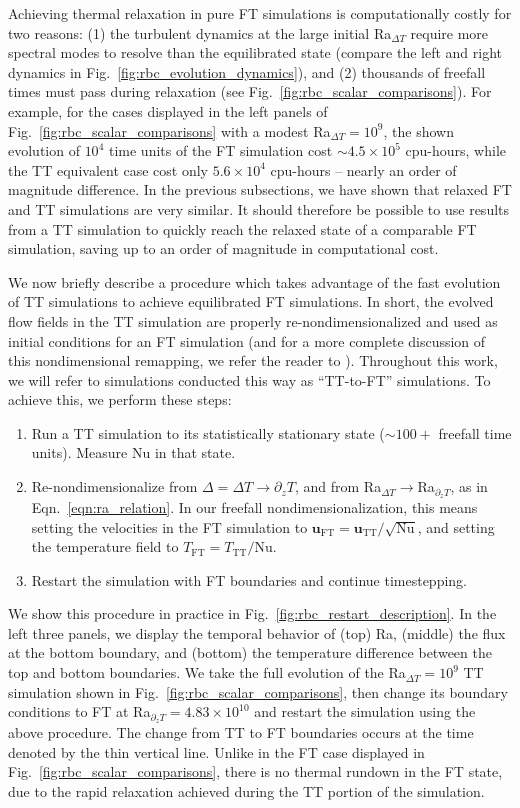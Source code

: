 Achieving thermal relaxation in pure FT simulations is computationally costly for two reasons: (1) the turbulent dynamics at the large initial Ra$_{\Delta T}$ require more spectral modes to resolve than the equilibrated state (compare the left and right dynamics in Fig.~\ref{fig:rbc_evolution_dynamics}), and (2) thousands of freefall times must pass during relaxation (see Fig.~\ref{fig:rbc_scalar_comparisons}).
For example, for the cases displayed in the left panels of Fig.~\ref{fig:rbc_scalar_comparisons} with a modest Ra$_{\Delta T} = 10^9$, the shown evolution of $10^4$ time units of the FT simulation cost $\sim 4.5 \times 10^5$ cpu-hours, while the TT equivalent case cost only $5.6 \times 10^4$ cpu-hours -- nearly an order of magnitude difference.
In the previous subsections, we have shown that relaxed FT and TT simulations are very similar.
It should therefore be possible to use results from a TT simulation to quickly reach the relaxed state of a comparable FT simulation, saving up to an order of magnitude in computational cost.

We now briefly describe a procedure which takes advantage of the fast evolution of TT simulations to achieve equilibrated FT simulations.
In short, the evolved flow fields in the TT simulation are properly re-nondimensionalized and used as initial conditions for an FT simulation (and for a more complete discussion of this nondimensional remapping, we refer the reader to \citet{calkins&all2015b}).
Throughout this work, we will refer to simulations conducted this way as ``TT-to-FT'' simulations.
To achieve this, we perform these steps:
\begin{enumerate}
\item Run a TT simulation to its statistically stationary state ($\sim100+$ freefall time units). 
Measure $\text{Nu}$ in that state.
\item Re-nondimensionalize from $\Delta = \Delta T \rightarrow \partial_z T$, and from Ra$_{\Delta T}\rightarrow$Ra$_{\partial_z T}$, as in Eqn.~\ref{eqn:ra_relation}.
In our freefall nondimensionalization, this means setting the velocities in the FT simulation to $\bm{u}_{\text{FT}} = \bm{u}_{\text{TT}} / \sqrt{\text{Nu}}$, and setting the temperature field to $T_{\text{FT}} = T_{\text{TT}} / \text{Nu}$.
\item Restart the simulation with FT boundaries and continue timestepping.
\end{enumerate}
We show this procedure in practice in Fig.~\ref{fig:rbc_restart_description}.
In the left three panels, we display the temporal behavior of (top) Ra, (middle) the flux at the bottom boundary, and (bottom) the temperature difference between the top and bottom boundaries.
We take the full evolution of the Ra$_{\Delta T} = 10^9$ TT simulation shown in Fig.~\ref{fig:rbc_scalar_comparisons}, then change its boundary conditions to FT at Ra$_{\partial_z T} = 4.83\times 10^{10}$ and restart the simulation using the above procedure.
The change from TT to FT boundaries occurs at the time denoted by the thin vertical line.
Unlike in the FT case displayed in Fig.~\ref{fig:rbc_scalar_comparisons}, there is no thermal rundown in the FT state, due to the rapid relaxation achieved during the TT portion of the simulation.

